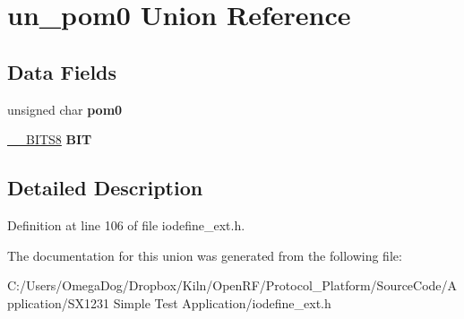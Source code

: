 \hypertarget{unionun__pom0}{\section{un\-\_\-pom0 Union Reference}
\label{unionun__pom0}
}
\subsection*{Data Fields}
\begin{DoxyCompactItemize}
\item 
\hypertarget{unionun__pom0_a8a67875bec926cb76c6a89f15f4105dd}{unsigned char {\bfseries pom0}}\label{unionun__pom0_a8a67875bec926cb76c6a89f15f4105dd}

\item 
\hypertarget{unionun__pom0_abec30179a71082b17326fec13746a603}{\hyperlink{struct_____b_i_t_s8}{\-\_\-\-\_\-\-B\-I\-T\-S8} {\bfseries B\-I\-T}}\label{unionun__pom0_abec30179a71082b17326fec13746a603}

\end{DoxyCompactItemize}


\subsection{Detailed Description}


Definition at line 106 of file iodefine\-\_\-ext.\-h.



The documentation for this union was generated from the following file\-:\begin{DoxyCompactItemize}
\item 
C\-:/\-Users/\-Omega\-Dog/\-Dropbox/\-Kiln/\-Open\-R\-F/\-Protocol\-\_\-\-Platform/\-Source\-Code/\-Application/\-S\-X1231 Simple Test Application/iodefine\-\_\-ext.\-h\end{DoxyCompactItemize}
